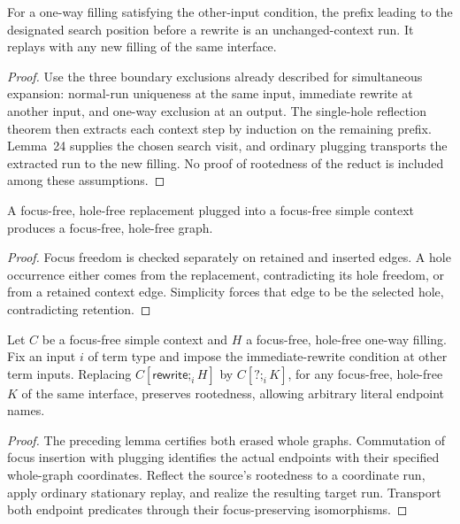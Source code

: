 \begin{theorem}
For a one-way filling satisfying the other-input condition, the prefix leading
to the designated search position before a rewrite is an unchanged-context
run. It replays with any new filling of the same interface.
\end{theorem}
\begin{proof}
Use the three boundary exclusions already described for simultaneous expansion:
normal-run uniqueness at the same input, immediate rewrite at another input,
and one-way exclusion at an output. The single-hole reflection theorem then
extracts each context step by induction on the remaining prefix. Lemma~24
supplies the chosen search visit, and ordinary plugging transports the
extracted run to the new filling. No proof of rootedness of the reduct is
included among these assumptions.
\end{proof}


\begin{lemma}
A focus-free, hole-free replacement plugged into a focus-free simple context
produces a focus-free, hole-free graph.
\end{lemma}
\begin{proof}
Focus freedom is checked separately on retained and inserted edges. A hole
occurrence either comes from the replacement, contradicting its hole freedom,
or from a retained context edge. Simplicity forces that edge to be the selected
hole, contradicting retention.
\end{proof}
\begin{theorem}
Let $C$ be a focus-free simple context and $H$ a focus-free, hole-free one-way
filling. Fix an input $i$ of term type and impose the immediate-rewrite
condition at other term inputs. Replacing $C[\mathsf{rewrite};_i H]$ by
$C[?;_i K]$, for any focus-free, hole-free $K$ of the same interface, preserves
rootedness, allowing arbitrary literal endpoint names.
\end{theorem}
\begin{proof}
The preceding lemma certifies both erased whole graphs. Commutation of focus
insertion with plugging identifies the actual endpoints with their specified
whole-graph coordinates. Reflect the source's rootedness to a coordinate run,
apply ordinary stationary replay, and realize the resulting target run.
Transport both endpoint predicates through their focus-preserving isomorphisms.
\end{proof}


